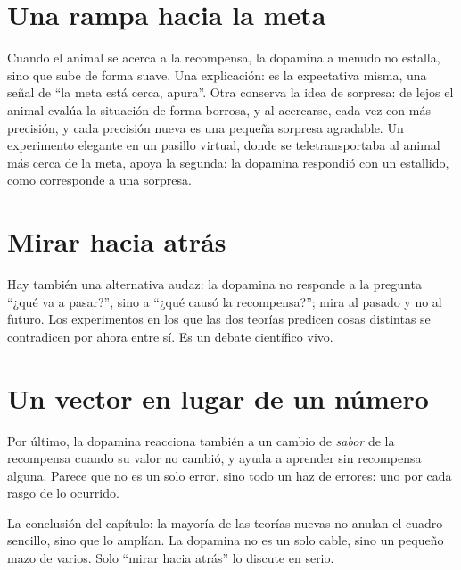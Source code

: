 \section*{Una rampa hacia la meta}

Cuando el animal se acerca a la recompensa, la dopamina a menudo no estalla, sino que sube de forma suave. Una explicación: es la expectativa misma, una señal de “la meta está cerca, apura”. Otra conserva la idea de sorpresa: de lejos el animal evalúa la situación de forma borrosa, y al acercarse, cada vez con más precisión, y cada precisión nueva es una pequeña sorpresa agradable. Un experimento elegante en un pasillo virtual, donde se teletransportaba al animal más cerca de la meta, apoya la segunda: la dopamina respondió con un estallido, como corresponde a una sorpresa.

\section*{Mirar hacia atrás}

Hay también una alternativa audaz: la dopamina no responde a la pregunta “¿qué va a pasar?”, sino a “¿qué causó la recompensa?”; mira al pasado y no al futuro. Los experimentos en los que las dos teorías predicen cosas distintas se contradicen por ahora entre sí. Es un debate científico vivo.

\section*{Un vector en lugar de un número}

Por último, la dopamina reacciona también a un cambio de \emph{sabor} de la recompensa cuando su valor no cambió, y ayuda a aprender sin recompensa alguna. Parece que no es un solo error, sino todo un haz de errores: uno por cada rasgo de lo ocurrido.

La conclusión del capítulo: la mayoría de las teorías nuevas no anulan el cuadro sencillo, sino que lo amplían. La dopamina no es un solo cable, sino un pequeño mazo de varios. Solo “mirar hacia atrás” lo discute en serio.

